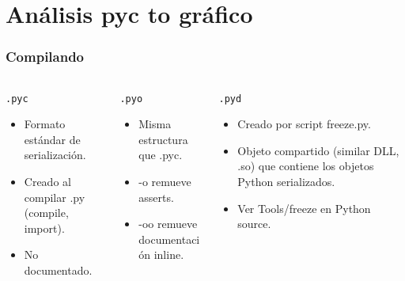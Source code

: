 \documentclass[9pt, notes=hide]{beamer}
\begin{document}
\section{Análisis pyc to gráfico}
    \begin{frame}
        \frametitle{Compilando}

        \begin{columns}[T]
            \begin{column}{.3\textwidth}
                \begin{beamerboxesrounded}[shadow=true]{\texttt{.pyc}}
                    \begin{itemize}
                        \item Formato estándar de serialización.
                        \item Creado al compilar .py (compile, import).
                        \item No documentado.
                    \end{itemize}
                \end{beamerboxesrounded}
            \end{column}

            \begin{column}{.3\textwidth}
                \begin{beamerboxesrounded}[shadow=true]{\texttt{.pyo}}
                    \begin{itemize}
                        \item Misma estructura que .pyc.
                        \item -o remueve asserts.
                        \item -oo remueve documentación inline.
                    \end{itemize}
                \end{beamerboxesrounded}
            \end{column}

            \begin{column}{.3\textwidth}
                \begin{beamerboxesrounded}[shadow=true]{\texttt{.pyd}}
                    \begin{itemize}
                        \item Creado por script freeze.py.
                        \item Objeto compartido (similar DLL, .so) que contiene los objetos Python serializados.
                        \item Ver Tools/freeze en Python source.
                    \end{itemize}
                \end{beamerboxesrounded}
            \end{column}
        \end{columns}
    \end{frame}
\end{document}
